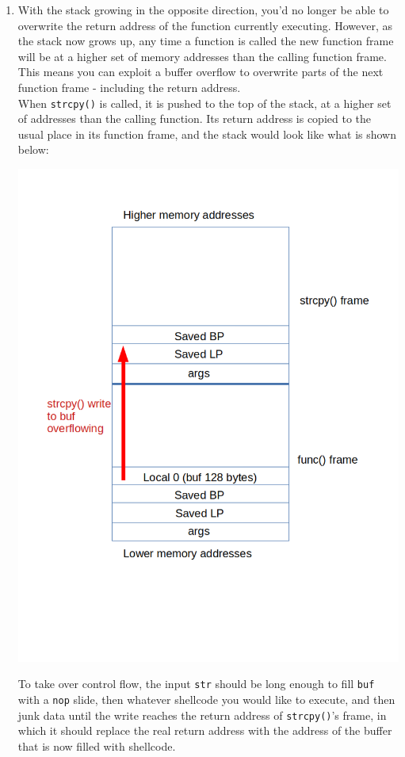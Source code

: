 \documentclass{jhwhw}
\begin{document}
\begin{enumerate}
\item With the stack growing in the opposite direction, you'd no longer be able to overwrite the return address of the function currently executing. However, as the stack now grows up, any time a function is called the new function frame will be at a higher set of memory addresses than the calling function frame. This means you can exploit a buffer overflow to overwrite parts of the next function frame - including the return address. 
\\
When \verb^strcpy()^ is called, it is pushed to the top of the stack, at a higher set of addresses than the calling function. Its return address is copied to the usual place in its function frame, and the stack would look like what is shown below:
\begin{center}
\includegraphics[scale=0.25]{HW1_1.png}
\end{center}
To take over control flow, the input \verb^str^ should be long enough to fill \verb^buf^ with a \verb^nop^ slide, then whatever shellcode you would like to execute, and then junk data until the write reaches the return address of \verb^strcpy()^'s frame, in which it should replace the real return address with the address of the buffer that is now filled with shellcode.

\end{enumerate}
\end{document}
